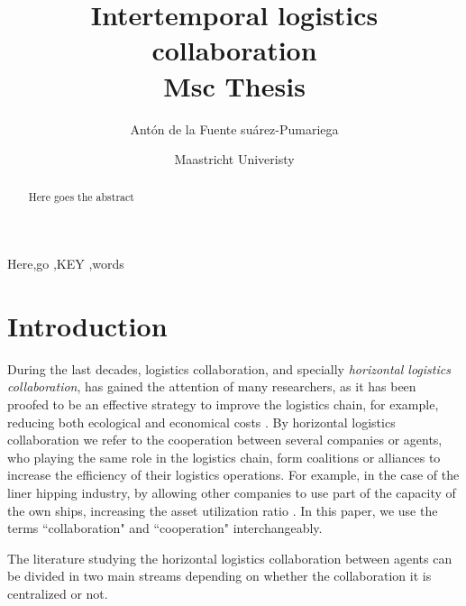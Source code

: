 \documentclass[review]{elsarticle}
\begin{document}
\begin{frontmatter}

\title{Intertemporal logistics collaboration \\[5pt]
                \normalsize{Msc Thesis}}

\author{Antón de la Fuente suárez-Pumariega}
\address{a.delafuentesuarez-pumariega@student.maastrichtuniverisry.nl }

\author{Maastricht Univeristy}



\begin{abstract}
Here goes the abstract
\end{abstract}

\begin{keyword}
Here\sep go \sep KEY \sep words
\end{keyword}

\end{frontmatter}


\section{Introduction}

During the last decades, logistics collaboration, and specially \emph{horizontal
logistics collaboration}, has gained the attention of many researchers, as it
has been proofed to be an effective strategy to improve the logistics chain, for
example, reducing both ecological and economical 
costs \cite{BALLOT2010} \cite{SOYSAL2018168}. By horizontal logistics collaboration we refer to the
cooperation between several companies or agents, who playing the same role in
the logistics chain, form coalitions or alliances to increase the efficiency of
their logistics operations. For example, in the case of the liner hipping
industry, by allowing other companies to use part of the capacity of the own
ships, increasing the asset utilization ratio \cite{AGARWAL2008175}. In this paper, we use the terms ``collaboration" and
``cooperation" interchangeably.


The literature studying the horizontal logistics collaboration between agents
can be divided in two main streams depending on whether the collaboration it is
centralized or not.
\end{document}
